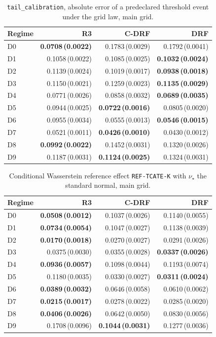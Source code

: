 \begin{table}[htbp]
\centering
\caption{\texttt{tail\_calibration}, absolute error of a predeclared threshold event under the grid law, main grid.}
\label{tab:all-tail}
\scriptsize
\setlength{\tabcolsep}{3.2pt}
\begin{tabular}{@{}lrrr@{}}
\toprule
Regime & R3 & C-DRF & DRF \\
\midrule
D0 & \textbf{0.0708\,(0.0022)} & 0.1783\,(0.0029) & 0.1792\,(0.0041) \\
D1 & 0.1058\,(0.0022) & 0.1085\,(0.0025) & \textbf{0.1032\,(0.0024)} \\
D2 & 0.1139\,(0.0024) & 0.1019\,(0.0017) & \textbf{0.0938\,(0.0018)} \\
D3 & 0.1150\,(0.0021) & 0.1259\,(0.0023) & \textbf{0.1135\,(0.0029)} \\
D4 & 0.0771\,(0.0026) & 0.0858\,(0.0032) & \textbf{0.0689\,(0.0035)} \\
D5 & 0.0944\,(0.0025) & \textbf{0.0722\,(0.0016)} & 0.0805\,(0.0020) \\
D6 & 0.0955\,(0.0034) & 0.0555\,(0.0013) & \textbf{0.0546\,(0.0015)} \\
D7 & 0.0521\,(0.0011) & \textbf{0.0426\,(0.0010)} & 0.0430\,(0.0012) \\
D8 & \textbf{0.0992\,(0.0022)} & 0.1452\,(0.0031) & 0.1320\,(0.0026) \\
D9 & 0.1187\,(0.0031) & \textbf{0.1124\,(0.0025)} & 0.1324\,(0.0031) \\
\bottomrule
\end{tabular}
\end{table}

\begin{table}[htbp]
\centering
\caption{Conditional Wasserstein reference effect \texttt{REF-TCATE-K} with $\nu_\star$ the standard normal, main grid.}
\label{tab:all-reftcate}
\scriptsize
\setlength{\tabcolsep}{3.2pt}
\begin{tabular}{@{}lrrr@{}}
\toprule
Regime & R3 & C-DRF & DRF \\
\midrule
D0 & \textbf{0.0508\,(0.0012)} & 0.1037\,(0.0026) & 0.1140\,(0.0055) \\
D1 & \textbf{0.0734\,(0.0054)} & 0.1047\,(0.0027) & 0.1138\,(0.0039) \\
D2 & \textbf{0.0170\,(0.0018)} & 0.0270\,(0.0027) & 0.0291\,(0.0026) \\
D3 & 0.0375\,(0.0030) & 0.0355\,(0.0028) & \textbf{0.0337\,(0.0026)} \\
D4 & \textbf{0.0936\,(0.0057)} & 0.1098\,(0.0044) & 0.1193\,(0.0074) \\
D5 & 0.1180\,(0.0035) & 0.0330\,(0.0027) & \textbf{0.0311\,(0.0024)} \\
D6 & \textbf{0.0389\,(0.0032)} & 0.0646\,(0.0058) & 0.0610\,(0.0062) \\
D7 & \textbf{0.0215\,(0.0017)} & 0.0278\,(0.0022) & 0.0285\,(0.0020) \\
D8 & \textbf{0.0406\,(0.0026)} & 0.0642\,(0.0050) & 0.0830\,(0.0056) \\
D9 & 0.1708\,(0.0096) & \textbf{0.1044\,(0.0031)} & 0.1277\,(0.0036) \\
\bottomrule
\end{tabular}
\end{table}

